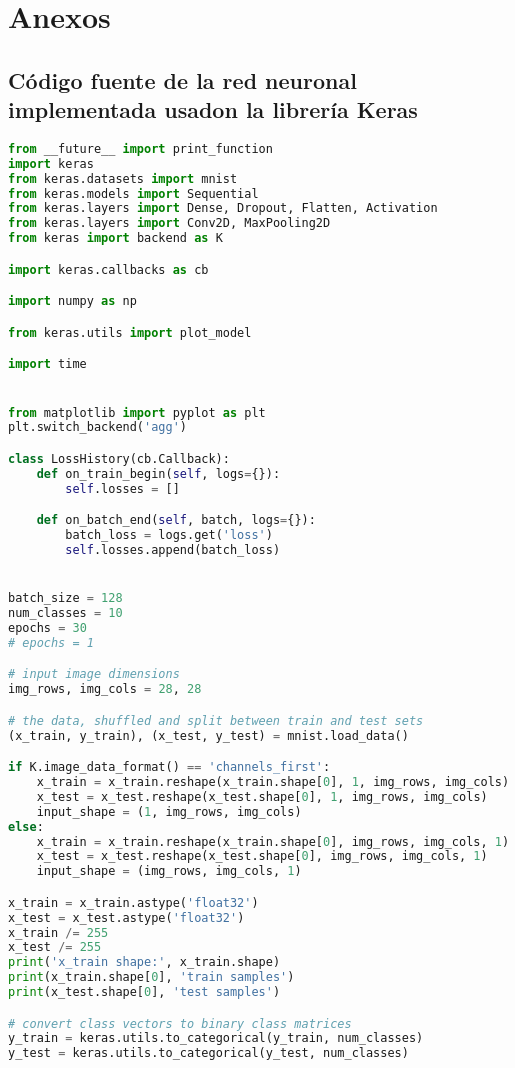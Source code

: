 \chapter{Anexos}

\section{Código fuente de la red neuronal implementada usadon la librería Keras}
\begin{lstlisting}[language=python]
from __future__ import print_function
import keras
from keras.datasets import mnist
from keras.models import Sequential
from keras.layers import Dense, Dropout, Flatten, Activation
from keras.layers import Conv2D, MaxPooling2D
from keras import backend as K

import keras.callbacks as cb

import numpy as np

from keras.utils import plot_model

import time


from matplotlib import pyplot as plt
plt.switch_backend('agg')

class LossHistory(cb.Callback):
    def on_train_begin(self, logs={}):
        self.losses = []

    def on_batch_end(self, batch, logs={}):
        batch_loss = logs.get('loss')
        self.losses.append(batch_loss)


batch_size = 128
num_classes = 10
epochs = 30
# epochs = 1

# input image dimensions
img_rows, img_cols = 28, 28

# the data, shuffled and split between train and test sets
(x_train, y_train), (x_test, y_test) = mnist.load_data()

if K.image_data_format() == 'channels_first':
    x_train = x_train.reshape(x_train.shape[0], 1, img_rows, img_cols)
    x_test = x_test.reshape(x_test.shape[0], 1, img_rows, img_cols)
    input_shape = (1, img_rows, img_cols)
else:
    x_train = x_train.reshape(x_train.shape[0], img_rows, img_cols, 1)
    x_test = x_test.reshape(x_test.shape[0], img_rows, img_cols, 1)
    input_shape = (img_rows, img_cols, 1)

x_train = x_train.astype('float32')
x_test = x_test.astype('float32')
x_train /= 255
x_test /= 255
print('x_train shape:', x_train.shape)
print(x_train.shape[0], 'train samples')
print(x_test.shape[0], 'test samples')

# convert class vectors to binary class matrices
y_train = keras.utils.to_categorical(y_train, num_classes)
y_test = keras.utils.to_categorical(y_test, num_classes)


\end{lstlisting}
